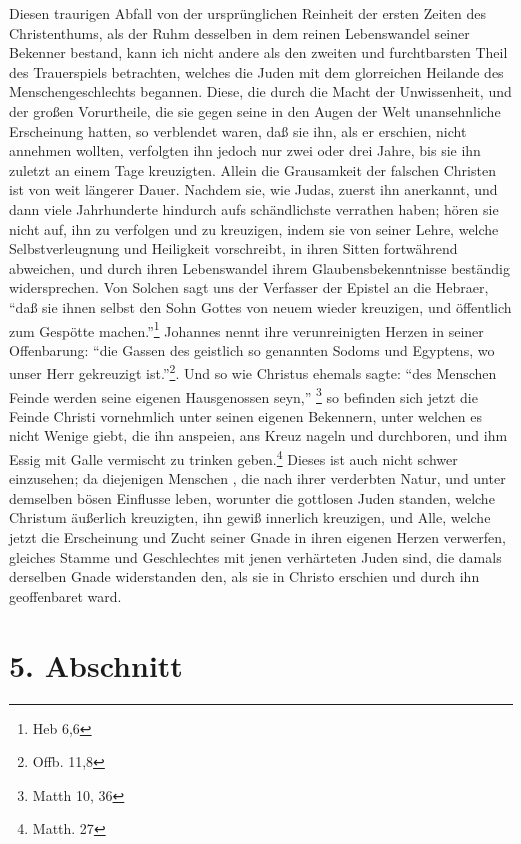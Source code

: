 Diesen traurigen Abfall von der ursprünglichen Reinheit der ersten Zeiten des Christenthums, als der Ruhm desselben in dem reinen Lebenswandel seiner Bekenner bestand, kann ich nicht andere als den zweiten und furchtbarsten Theil des Trauerspiels betrachten, welches die Juden mit dem glorreichen Heilande des Menschengeschlechts begannen. Diese, die durch die Macht der Unwissenheit, und der großen Vorurtheile, die sie gegen seine in den Augen der Welt unansehnliche Erscheinung hatten, so verblendet waren, daß sie ihn, als er erschien, nicht annehmen wollten, verfolgten ihn jedoch nur zwei oder drei Jahre, bis sie ihn zuletzt an einem Tage kreuzigten. Allein die Grausamkeit der falschen Christen ist von weit längerer Dauer. Nachdem sie, wie Judas, zuerst ihn anerkannt, und dann viele Jahrhunderte hindurch aufs schändlichste verrathen haben; hören sie nicht auf, ihn zu verfolgen und zu kreuzigen, indem sie von seiner Lehre, welche Selbstverleugnung und Heiligkeit vorschreibt, in ihren Sitten fortwährend abweichen, und durch ihren Lebenswandel ihrem Glaubensbekenntnisse beständig widersprechen. Von Solchen sagt uns der Verfasser der Epistel an die Hebraer, ``daß sie ihnen selbst den Sohn Gottes von neuem wieder kreuzigen, und öffentlich zum Gespötte machen.''\footnote{Heb 6,6} Johannes nennt ihre verunreinigten Herzen in seiner Offenbarung: ``die Gassen des geistlich so genannten Sodoms und Egyptens, wo unser Herr gekreuzigt ist.''\footnote{Offb. 11,8}. Und so wie Christus ehemals sagte: ``des Menschen Feinde werden seine eigenen Hausgenossen seyn,'' \footnote{Matth 10, 36} so befinden sich jetzt die Feinde Christi vornehmlich unter seinen eigenen Bekennern, unter welchen es nicht Wenige giebt, die ihn anspeien, ans Kreuz nageln und durchboren, und ihm Essig mit Galle vermischt zu trinken geben.\footnote{Matth. 27} Dieses ist auch nicht schwer einzusehen; da diejenigen Menschen , die nach ihrer verderbten Natur, und unter demselben bösen Einflusse leben, worunter die gottlosen Juden standen, welche Christum äußerlich kreuzigten, ihn gewiß innerlich kreuzigen, und Alle, welche jetzt die Erscheinung und Zucht seiner Gnade in ihren eigenen Herzen verwerfen, gleiches Stamme und Geschlechtes mit jenen verhärteten Juden sind, die damals derselben Gnade widerstanden den, als sie in Christo erschien und durch ihn geoffenbaret ward.

\section{5. Abschnitt}


